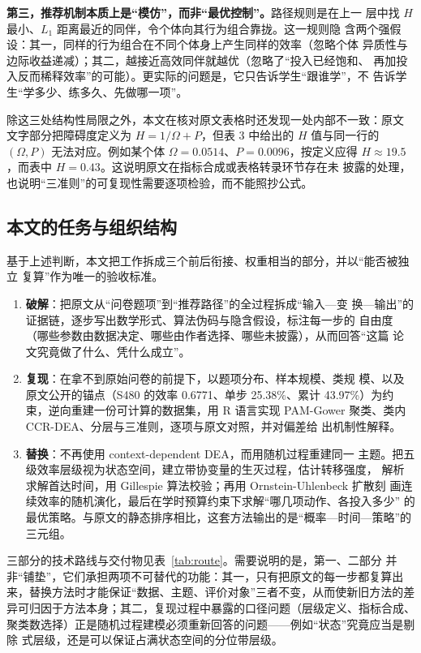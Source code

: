 \textbf{第三，推荐机制本质上是“模仿”，而非“最优控制”。}路径规则是在上一
层中找 $H$ 最小、$L_1$ 距离最近的同伴，令个体向其行为组合靠拢。这一规则隐
含两个强假设：其一，同样的行为组合在不同个体身上产生同样的效率（忽略个体
异质性与边际收益递减）；其二，越接近高效同伴就越优（忽略了“投入已经饱和、
再加投入反而稀释效率”的可能）。更实际的问题是，它只告诉学生“跟谁学”，不
告诉学生“学多少、练多久、先做哪一项”。

除这三处结构性局限之外，本文在核对原文表格时还发现一处内部不一致：原文
文字部分把障碍度定义为 $H=1/\Omega+P$，但表 3 中给出的 $H$ 值与同一行的
$(\Omega,P)$ 无法对应。例如某个体 $\Omega=0.0514$、$P=0.0096$，按定义应得
$H\approx 19.5$，而表中 $H=0.43$。这说明原文在指标合成或表格转录环节存在未
披露的处理，也说明“三准则”的可复现性需要逐项检验，而不能照抄公式。

\subsection{本文的任务与组织结构}

基于上述判断，本文把工作拆成三个前后衔接、权重相当的部分，并以“能否被独立
复算”作为唯一的验收标准。

\begin{enumerate}[label=（\arabic*）,itemsep=3pt,topsep=3pt,leftmargin=3em]
\item \textbf{破解}：把原文从“问卷题项”到“推荐路径”的全过程拆成“输入—变
  换—输出”的证据链，逐步写出数学形式、算法伪码与隐含假设，标注每一步的
  自由度（哪些参数由数据决定、哪些由作者选择、哪些未披露），从而回答“这篇
  论文究竟做了什么、凭什么成立”。
\item \textbf{复现}：在拿不到原始问卷的前提下，以题项分布、样本规模、类规
  模、以及原文公开的锚点（S480 的效率 0.6771、单步 25.38\%、累计
  43.97\%）为约束，逆向重建一份可计算的数据集，用 R 语言实现
  PAM-Gower 聚类、类内 CCR-DEA、分层与三准则，逐项与原文对照，并对偏差给
  出机制性解释。
\item \textbf{替换}：不再使用 context-dependent DEA，而用随机过程重建同一
  主题。把五级效率层级视为状态空间，建立带协变量的生灭过程，估计转移强度，
  解析求解首达时间，用 Gillespie 算法校验；再用 Ornstein-Uhlenbeck 扩散刻
  画连续效率的随机演化，最后在学时预算约束下求解“哪几项动作、各投入多少”
  的最优策略。与原文的静态排序相比，这套方法输出的是“概率—时间—策略”的
  三元组。
\end{enumerate}

三部分的技术路线与交付物见表~\ref{tab:route}。需要说明的是，第一、二部分
并非“铺垫”，它们承担两项不可替代的功能：其一，只有把原文的每一步都复算出
来，替换方法时才能保证“数据、主题、评价对象”三者不变，从而使新旧方法的差
异可归因于方法本身；其二，复现过程中暴露的口径问题（层级定义、指标合成、
聚类数选择）正是随机过程建模必须重新回答的问题——例如“状态”究竟应当是剔除
式层级，还是可以保证占满状态空间的分位带层级。

